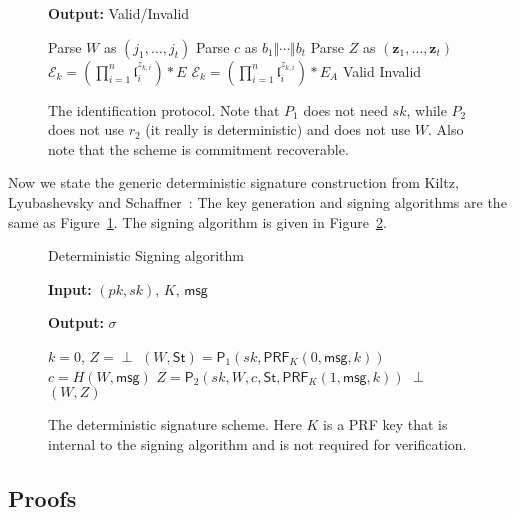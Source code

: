 \documentclass{llncs}
\newcommand{\E}{\mathcal{E}}
\newcommand{\msg}{\mathsf{msg}}
\renewcommand{\l}{\mathfrak{l}}
\newcommand{\z}{\mathbf{z}}
\newcommand{\PP}{\mathsf{P}}
\newcommand{\St}{\textsf{St}}
\newcommand{\PRF}{\mathsf{PRF}}
\begin{document}
\begin{figure}
\begin{minipage}{0.45\textwidth}
\begin{algorithm}[H]
	\textbf{Output:} Valid/Invalid

	\begin{algorithmic}[1]
		\State Parse $W$ as $(j_1 , \dots, j_t)$
		\State Parse $c$ as $b_1 \Vert \cdots \Vert b_t$
		\State Parse $Z$ as $(\z_1, \dots, \z_t)$
		\State $\E_k = ( \prod_{i=1}^n \l_i^{z_{k,i}} ) * E$
		\Else
		\State $\E_k = ( \prod_{i=1}^n \l_i^{z_{k,i}} ) * E_A$
		\EndIf
		\EndFor
		\If{$(j_1, \dots, j_t) = (j(\E_1) , \dots, j(\E_t))$} \State \Return Valid
		\Else \State \Return Invalid \EndIf
	\end{algorithmic}
\end{algorithm}
\end{minipage}
\caption{The identification protocol. Note that $P_1$ does not need $sk$, while $P_2$ does not use $r_2$ (it really is deterministic) and does not use $W$. Also note that the scheme is commitment recoverable. \label{fig:id-scheme}}
\end{figure}


Now we state the generic deterministic signature construction from Kiltz, Lyubashevsky and Schaffner~\cite{KLS18}:
The key generation and signing algorithms are the same as Figure~\ref{fig:id-scheme}. The signing algorithm is given in Figure~\ref{fig:sign}. 

\begin{figure}
\begin{algorithm}[H]
	\caption{Deterministic Signing algorithm}
	\textbf{Input:} $(pk,sk)$, $K$, $\msg$

	\textbf{Output:} $\sigma$

	\begin{algorithmic}[1]
		\State $k = 0$, $Z = \perp$
		\State $(W,\St) = \PP_1( sk, \PRF_K( 0, \msg, k ))$
		\State $c = H( W, \msg )$ 
		\State $Z = \PP_2( sk, W, c, \St, \PRF_K( 1, \msg, k ))$
		\EndWhile
		\State \Return $\perp$
		\Else
		\State \Return $(W,Z)$
		\EndIf
	\end{algorithmic}
\end{algorithm}
\caption{The deterministic signature scheme. Here $K$ is a PRF key that is internal to the signing algorithm and is not required for verification. \label{fig:sign}}
\end{figure}


\subsection{Proofs}
\end{document}
